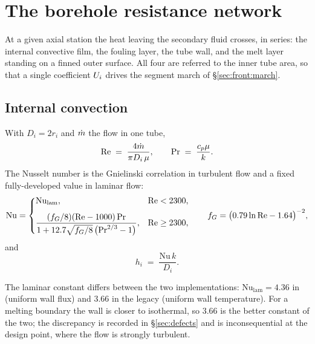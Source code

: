 \section{The borehole resistance network}
\label{sec:network}

At a given axial station the heat leaving the secondary fluid crosses, in
series: the internal convective film, the fouling layer, the tube wall, and the
melt layer standing on a finned outer surface. All four are referred to the
inner tube area, so that a single coefficient $U_{i}$ drives the segment march of
\S\ref{sec:front:march}.

\subsection{Internal convection}

With $D_{i}=2r_{i}$ and $\dot m$ the flow in one tube,
\begin{equation}
  \mathrm{Re} \;=\; \frac{4\dot m}{\pi D_{i}\,\mu},
  \qquad
  \mathrm{Pr} \;=\; \frac{c_{p}\mu}{k}.
\end{equation}
The Nusselt number is the Gnielinski correlation in turbulent flow and a fixed
fully-developed value in laminar flow:
\begin{equation}
  \mathrm{Nu} =
  \begin{dcases}
    \mathrm{Nu}_{\mathrm{lam}}, & \mathrm{Re} < 2300, \\[4pt]
    \frac{(f_{G}/8)(\mathrm{Re}-1000)\,\mathrm{Pr}}
         {1 + 12.7\sqrt{f_{G}/8}\,\bigl(\mathrm{Pr}^{2/3}-1\bigr)},
      & \mathrm{Re} \geq 2300,
  \end{dcases}
  \qquad
  f_{G} = \bigl(0.79\ln\mathrm{Re} - 1.64\bigr)^{-2},
  \label{eq:gnielinski}
\end{equation}
and
\begin{equation}
  h_{i} \;=\; \frac{\mathrm{Nu}\,k}{D_{i}} .
\end{equation}

The laminar constant differs between the two implementations:
$\mathrm{Nu}_{\mathrm{lam}}=4.36$ in  (uniform wall flux) and
$3.66$ in the legacy  (uniform wall
temperature). For a melting boundary the wall is closer to isothermal, so $3.66$
is the better constant of the two; the discrepancy is recorded in
\S\ref{sec:defects} and is inconsequential at the design point, where the flow
is strongly turbulent.

